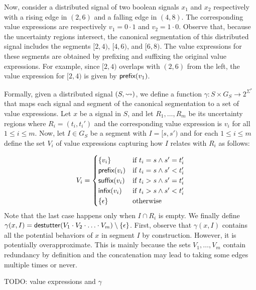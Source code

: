 Now, consider a distributed signal of two boolean signals $x_1$ and $x_2$ respectively with a rising edge in $(2,6)$ and a falling edge in $(4,8)$.
The corresponding value expressions are respectively $v_1 = 0 \cdot 1$ and $v_2 = 1 \cdot 0$.
Observe that, because the uncertainty regions intersect, the canonical segmentation of this distributed signal includes the segments $[2,4)$, $[4,6)$, and $[6,8)$.
The value expressions for these segments are obtained by prefixing and suffixing the original value expressions.
For example, since $[2,4)$ overlaps with $(2,6)$ from the left, the value expression for $[2,4)$ is given by $\textsf{prefix}(v_1)$.


Formally, given a distributed signal $(S,{\rightsquigarrow})$, we define a function $\gamma : S \times G_S \to 2^{\Sigma^*}$ that maps each signal and segment of the canonical segmentation to a set of value expressions.
Let $x$ be a signal in $S$, and let $R_1, \ldots, R_m$ be its uncertainty regions where $R_i = (t_i, t_i')$ and the corresponding value expression is $v_i$ for all $1 \leq i \leq m$.
Now, let $I \in G_S$ be a segment with $I = [s, s')$ and for each $1 \leq i \leq m$ define the set $V_i$ of value expressions capturing how $I$ relates with $R_i$ as follows:

\small
\begin{equation*}
	V_i = 
	\begin{cases}
		\{v_i\} & \text{if } t_i = s \land s' = t_i' \\
		\textsf{prefix}(v_i) & \text{if } t_i = s \land s' < t_i' \\
		\textsf{suffix}(v_i) & \text{if } t_i > s \land s' = t_i' \\
		\textsf{infix}(v_i) & \text{if } t_i > s \land s' < t_i' \\
		\{\epsilon\} & \text{otherwise}
	\end{cases}
\end{equation*}
\normalsize
Note that the last case happens only when $I \cap R_i$ is empty.
We finally define $\gamma(x,I) = \mathsf{destutter}(V_1 \cdot V_2 \cdot \ldots \cdot V_m) \setminus \{\epsilon\}$.
First, observe that $\gamma(x,I)$ contains all the potential behaviors of $x$ in segment $I$ by construction.
However, it is potentially overapproximate.
This is mainly because the sets $V_1, \ldots, V_m$ contain redundancy by definition and the concatenation may lead to taking some edges multiple times or never.

\begin{example} \label{ex:valexpr}
	\alert{TODO: value expressions and $\gamma$}
\end{example}

